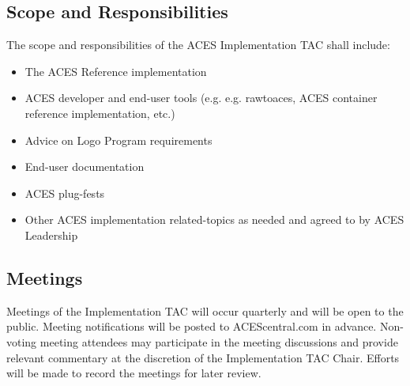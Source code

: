 \subsection{Scope and Responsibilities}
The scope and responsibilities of the ACES Implementation TAC shall include:

\begin{itemize}
    \item The ACES Reference implementation
    \item ACES developer and end-user tools (e.g. e.g. rawtoaces, ACES container reference implementation, etc.)
    \item Advice on Logo Program requirements
    \item End-user documentation
    \item ACES plug-fests
    \item Other ACES implementation related-topics as needed and agreed to by ACES Leadership
\end{itemize}

\subsection{Meetings}
Meetings of the Implementation TAC will occur quarterly and will be open to the public. Meeting notifications will be posted to ACEScentral.com in advance. Non-voting meeting attendees may participate in the meeting discussions and provide relevant commentary at the discretion of the Implementation TAC Chair. Efforts will be made to record the meetings for later review. 